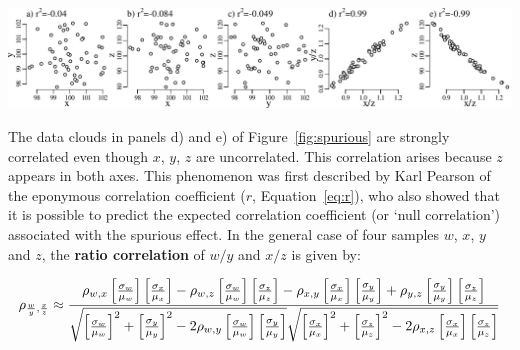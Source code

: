 \begin{enumerate}
\noindent\begin{minipage}[t][][b]{\linewidth}
\includegraphics[width=\textwidth]{../figures/spurious.pdf}
  \label{fig:spurious}
\end{minipage}

The data clouds in panels d) and e) of Figure~\ref{fig:spurious} are
strongly correlated even though $x$, $y$, $z$ are uncorrelated.  This
correlation arises because $z$ appears in both axes.  This phenomenon
was first described by Karl Pearson of the eponymous correlation
coefficient ($r$, Equation~\ref{eq:r}), who also showed that it is
possible to predict the expected correlation coefficient (or `null
correlation') associated with the spurious effect. In the general case
of four samples $w$, $x$, $y$ and $z$, the \textbf{ratio correlation}
of $w/y$ and $x/z$ is given by:

\begin{equation}
  \noindent \rho_{\frac{w}{y},\frac{x}{z}} \approx
  \frac{\rho_{w,x}\left[\frac{\sigma_w}{\mu_w}\right]
    \left[\frac{\sigma_x}{\mu_x}\right] -
    \rho_{w,z}\left[\frac{\sigma_w}{\mu_w}\right]
    \left[\frac{\sigma_z}{\mu_z}\right] -
    \rho_{x,y}\left[\frac{\sigma_x}{\mu_x}\right]
    \left[\frac{\sigma_y}{\mu_y}\right] +
    \rho_{y,z}\left[\frac{\sigma_y}{\mu_y}\right]
    \left[\frac{\sigma_z}{\mu_z}\right]
  }{
    \sqrt{\left[\frac{\sigma_w}{\mu_w}\right]^2 +
      \left[\frac{\sigma_y}{\mu_y}\right]^2 -
      2 \rho_{w,y}\left[\frac{\sigma_w}{\mu_w}\right]
      \left[\frac{\sigma_y}{\mu_y}\right]}
    \sqrt{\left[\frac{\sigma_x}{\mu_x}\right]^2 +
      \left[\frac{\sigma_z}{\mu_z}\right]^2 -
      2 \rho_{x,z}\left[\frac{\sigma_x}{\mu_x}\right]
      \left[\frac{\sigma_z}{\mu_z}\right]
    }
  }
  \label{eq:spurious}
\end{equation}


\end{enumerate}
